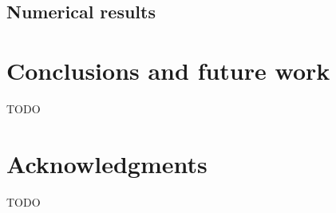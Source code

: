 \documentclass[sigconf]{acmart}
\begin{document}
\subsection{Numerical results }
 
\section{Conclusions and future work}
 TODO
 
\section*{Acknowledgments} 
TODO



 
\end{document}
